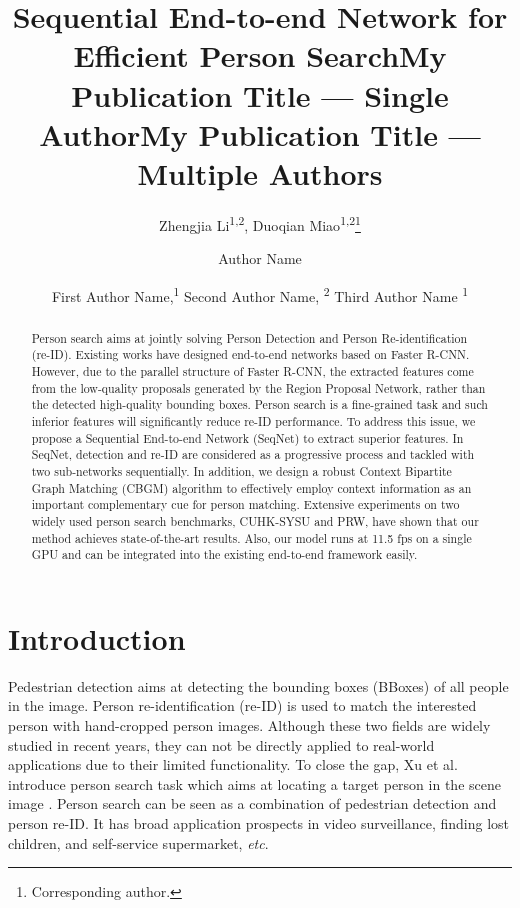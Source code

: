 \documentclass[letterpaper]{article} \usepackage{aaai21}  \usepackage{times}  \usepackage{helvet} \usepackage{courier}  \usepackage[hyphens]{url}  \usepackage{graphicx} \urlstyle{rm} \def\UrlFont{\rm}  \usepackage{natbib}  \usepackage{caption} \usepackage{multirow}
\title{Sequential End-to-end Network for Efficient Person Search}
\author{

Zhengjia Li\textsuperscript{\rm 1,2},
    Duoqian Miao\textsuperscript{\rm 1,2}\thanks{Corresponding author.}
}
\title{My Publication Title --- Single Author}
\author {
Author Name \\
}
\title{My Publication Title --- Multiple Authors}
\author {
First Author Name,\textsuperscript{\rm 1}
    Second Author Name, \textsuperscript{\rm 2}
    Third Author Name \textsuperscript{\rm 1} \\
}
\begin{document}
\maketitle

\begin{abstract}
    Person search aims at jointly solving Person Detection and Person Re-identification (re-ID). Existing works have designed end-to-end networks based on Faster R-CNN. However, due to the parallel structure of Faster R-CNN, the extracted features come from the low-quality proposals generated by the Region Proposal Network, rather than the detected high-quality bounding boxes. Person search is a fine-grained task and such inferior features will significantly reduce re-ID performance. To address this issue, we propose a Sequential End-to-end Network (SeqNet) to extract superior features. In SeqNet, detection and re-ID are considered as a progressive process and tackled with two sub-networks sequentially. In addition, we design a robust Context Bipartite Graph Matching (CBGM) algorithm to effectively employ context information as an important complementary cue for person matching. Extensive experiments on two widely used person search benchmarks, CUHK-SYSU and PRW, have shown that our method achieves state-of-the-art results.
    Also, our model runs at 11.5 fps on a single GPU and can be integrated into the existing end-to-end framework easily.
\end{abstract}

\section{Introduction}
\noindent Pedestrian detection \cite{rcnn,fast-rcnn,faster-rcnn} aims at detecting the bounding boxes (BBoxes) of all people in the image. Person re-identification (re-ID) \cite{yang2017unsupervised,zhao2017consistent,wang2019spatial,fu2019horizontal,hao2019hsme,zhao2020deep} is used to match the interested person with hand-cropped person images. Although these two fields are widely studied in recent years, they can not be directly applied to real-world applications due to their limited functionality. To close the gap, Xu et al. introduce person search task which aims at locating a target person in the scene image \cite{first-ps}. Person search can be seen as a combination of pedestrian detection and person re-ID. It has broad application prospects in video surveillance, finding lost children, and self-service supermarket, \textit{etc}.
\end{document}
